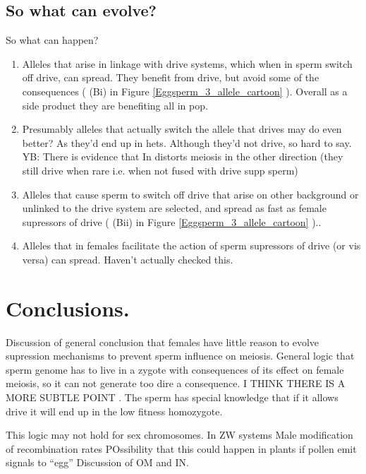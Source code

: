 \documentclass[12pt,letterpaper]{article}
\begin{document}
\subsection{So what can evolve?}
So what can happen?
\begin{enumerate}
\item Alleles that arise in linkage with drive systems, which when in sperm switch off drive, 
can spread. They benefit from drive, but avoid some of the
consequences ( (Bi) in Figure \ref{Eggsperm_3_allele_cartoon} ). Overall as a side product they are benefiting all in pop.\\
\item Presumably alleles that actually switch the allele that drives may do even better? As they'd end up in 
hets. Although they'd not drive, so hard to say. YB: There is evidence that In distorts meiosis in the other direction (they still drive when rare i.e. when not fused with drive supp sperm) \\
\item Alleles that cause sperm to switch off drive that arise on other background or unlinked to the drive system
are selected, and spread as fast as female supressors of drive ( (Bii) in Figure \ref{Eggsperm_3_allele_cartoon} )..\\
\item Alleles that in females facilitate the action of sperm supressors of drive (or vis versa) can spread. Haven't actually checked this.\\
\end{enumerate}

\section*{Conclusions.}
Discussion of general conclusion that females have little reason to evolve supression mechanisms to prevent sperm influence on meiosis. 
General logic that sperm genome has to live in a zygote with consequences of its effect on female meiosis, so
it can not generate too dire a consequence.
I THINK THERE IS A MORE SUBTLE POINT . The sperm has special knowledge that if it allows drive it will end up in the low fitness homozygote. 


This logic may not hold for sex chromosomes. In ZW systems 
 Male modification of recombination rates
POssibility that this could happen in plants if pollen emit signals to ``egg''
Discussion of OM and IN.


\end{document}
